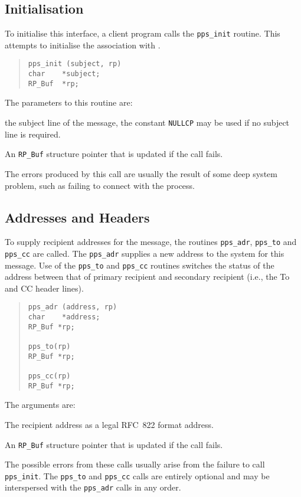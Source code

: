 \subsection{Initialisation}

To initialise this interface, a client program calls the
\verb|pps_init| routine. This attempts to initialise the association
with .
\begin{quote}\small\begin{verbatim}
pps_init (subject, rp)
char    *subject;
RP_Buf  *rp;
\end{verbatim}\end{quote}
The parameters to this routine are:
\begin{describe}

\item[\verb|subject|:]	the subject line of the message, the constant
\verb|NULLCP| may be used if no subject line is required.

\item[\verb|rp|:] An \verb|RP_Buf| structure pointer that is updated
if the call fails.
\end{describe}

The errors produced by this call are usually the result of some deep
system problem, such as failing to connect with the  process.

\subsection{Addresses and Headers}

To supply recipient addresses for the message, the routines
\verb|pps_adr|, \verb|pps_to| and \verb|pps_cc| are called. The
\verb|pps_adr| supplies a new address to the system for this message.
Use of the \verb|pps_to| and \verb|pps_cc| routines switches the
status of the address between that of primary recipient and secondary
recipient (i.e., the To and CC header lines).
\begin{quote}\begin{verbatim}
pps_adr (address, rp)
char    *address;
RP_Buf *rp;

pps_to(rp)
RP_Buf *rp;

pps_cc(rp)
RP_Buf *rp;
\end{verbatim}\end{quote}
The arguments are:
\begin{describe}
\item[\verb|address|:]	The recipient address as a legal RFC~822
format address.

\item[\verb|rp|:] An \verb|RP_Buf| structure pointer that is updated
if the call fails.
\end{describe}
The possible errors from these calls usually arise from the failure to
call \verb|pps_init|. The \verb|pps_to| and \verb|pps_cc| calls are
entirely optional and may be interspersed with the \verb|pps_adr|
calls in any order.

